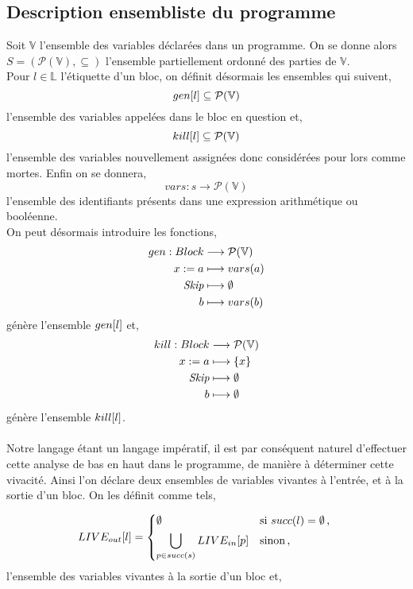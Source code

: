 \documentclass[a4paper, 12pt]{article}
\begin{document}
\subsection{Description ensembliste du programme}
Soit $\mathbb{V}$ l'ensemble des variables déclarées dans un programme. On se donne alors $S = (\mathcal{P}(\mathbb{V}), \subseteq)$
l'ensemble partiellement ordonné des parties de $\mathbb{V}$.
\\
Pour $l \in \mathbb{L}$ l'étiquette d'un bloc, on définit désormais les ensembles qui suivent,
\[gen[l] \subseteq \mathcal{P}(\mathbb{V})\]
l'ensemble des variables appelées dans le bloc en question et,
\[kill[l] \subseteq \mathcal{P}(\mathbb{V})\]
l'ensemble des variables nouvellement assignées donc considérées pour lors comme mortes. Enfin on se donnera,
\[vars : s \longrightarrow \mathcal{P}(\mathbb{V})\]
l'ensemble des identifiants présents dans une expression arithmétique ou booléenne.
\\
On peut désormais introduire les fonctions,
\begin{align*}
	gen : Block &\longrightarrow \mathcal{P}(\mathbb{V})\\
	{x}\space:=\space{a} &\longmapsto vars(a)\\
	\textit{Skip} &\longmapsto \emptyset\\
	b &\longmapsto vars(b)
\end{align*}
génère l'ensemble $gen[l]$ et,
\begin{align*}
	kill : Block &\longrightarrow \mathcal{P}(\mathbb{V})\\
	{x}\space:=\space{a} &\longmapsto \{x\}\\
	\textit{Skip} &\longmapsto \emptyset\\
	b &\longmapsto \emptyset
\end{align*}
génère l'ensemble $kill[l]$.
\\
\\
Notre langage étant un langage impératif, il est par conséquent naturel d'effectuer cette analyse de bas en haut dans le programme,
de manière à déterminer cette vivacité. Ainsi l'on déclare deux ensembles de variables vivantes à l'entrée, et à la
sortie d'un bloc. On les définit comme tels,

\[
	LIVE_{out}[l] = 
	\begin{dcases*}
		\emptyset &si $succ(l) = \emptyset $\,, \\
		\bigcup\limits_{p\in succ(s)} LIVE_{in}[p] &sinon\,,
	\end{dcases*}
\]
l'ensemble des variables vivantes à la sortie d'un bloc et,
\end{document}

